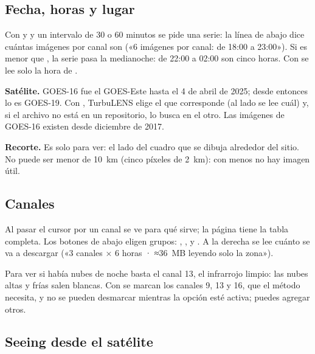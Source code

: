 \subsection{Fecha, horas y lugar}

Con  y  y un intervalo de 30 o 60 minutos se pide una serie: la línea de abajo dice cuántas
imágenes por canal son («6 imágenes por canal: de 18:00 a 23:00»). Si  es menor que , la serie
pasa la medianoche: de 22:00 a 02:00 son cinco horas. Con  se lee solo la hora de .

\textbf{Satélite.} GOES-16 fue el GOES-Este hasta el 4 de abril de 2025; desde entonces lo es GOES-19. Con
, TurbuLENS elige el que corresponde (al lado se lee cuál) y, si el archivo no está en
un repositorio, lo busca en el otro. Las imágenes de GOES-16 existen desde diciembre de 2017.

\textbf{Recorte.} Es solo para ver: el lado del cuadro que se dibuja alrededor del sitio. No puede ser menor de 10~km
(cinco píxeles de 2~km): con menos no hay imagen útil.

\subsection{Canales}

Al pasar el cursor por un canal se ve para qué sirve; la página  tiene la tabla completa. Los botones
de abajo eligen grupos: , ,  y . A la
derecha se lee cuánto se va a descargar («3 canales × 6 horas · ≈36~MB leyendo solo la zona»).

Para ver si había nubes de noche basta el canal 13, el infrarrojo limpio: las nubes altas y frías salen blancas. Con
 se marcan los canales 9, 13 y 16, que el método necesita, y no se pueden desmarcar mientras
la opción esté activa; puedes agregar otros.

\subsection{Seeing desde el satélite}


